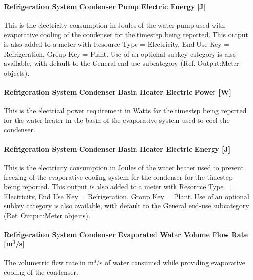 \paragraph{Refrigeration System Condenser Pump Electric Energy {[}J{]}}\label{refrigeration-system-condenser-pump-electric-energy-j}

This is the electricity consumption in Joules of the water pump used with evaporative cooling of the condenser for the timestep being reported. This output is also added to a meter with Resource Type = Electricity, End Use Key = Refrigeration, Group Key = Plant. Use of an optional subkey category is also available, with default to the General end-use subcategory (Ref. Output:Meter objects).

\paragraph{Refrigeration System Condenser Basin Heater Electric Power {[}W{]}}\label{refrigeration-system-condenser-basin-heater-electric-power-w}

This is the electrical power requirement in Watts for the timestep being reported for the water heater in the basin of the evaporative system used to cool the condenser.

\paragraph{Refrigeration System Condenser Basin Heater Electric Energy {[}J{]}}\label{refrigeration-system-condenser-basin-heater-electric-energy-j}

This is the electricity consumption in Joules of the water heater used to prevent freezing of the evaporative cooling system for the condenser for the timestep being reported. This output is also added to a meter with Resource Type = Electricity, End Use Key = Refrigeration, Group Key = Plant. Use of an optional subkey category is also available, with default to the General end-use subcategory (Ref. Output:Meter objects).

\paragraph{Refrigeration System Condenser Evaporated Water Volume Flow Rate {[}m\(^{3}\)/s{]}}\label{refrigeration-system-condenser-evaporated-water-volume-flow-rate-m3s}

The volumetric flow rate in m\(^{3}\)/s of water consumed while providing evaporative cooling of the condenser.

